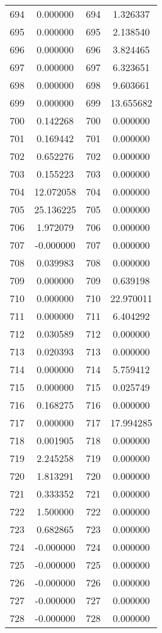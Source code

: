 \documentclass[12pt]{article}
\begin{document}
\begin{longtable}{@{}cccc@{}}
694 & 0.000000 & 694 & 1.326337 \\
695 & 0.000000 & 695 & 2.138540 \\
696 & 0.000000 & 696 & 3.824465 \\
697 & 0.000000 & 697 & 6.323651 \\
698 & 0.000000 & 698 & 9.603661 \\
699 & 0.000000 & 699 & 13.655682 \\
700 & 0.142268 & 700 & 0.000000 \\
701 & 0.169442 & 701 & 0.000000 \\
702 & 0.652276 & 702 & 0.000000 \\
703 & 0.155223 & 703 & 0.000000 \\
704 & 12.072058 & 704 & 0.000000 \\
705 & 25.136225 & 705 & 0.000000 \\
706 & 1.972079 & 706 & 0.000000 \\
707 & -0.000000 & 707 & 0.000000 \\
708 & 0.039983 & 708 & 0.000000 \\
709 & 0.000000 & 709 & 0.639198 \\
710 & 0.000000 & 710 & 22.970011 \\
711 & 0.000000 & 711 & 6.404292 \\
712 & 0.030589 & 712 & 0.000000 \\
713 & 0.020393 & 713 & 0.000000 \\
714 & 0.000000 & 714 & 5.759412 \\
715 & 0.000000 & 715 & 0.025749 \\
716 & 0.168275 & 716 & 0.000000 \\
717 & 0.000000 & 717 & 17.994285 \\
718 & 0.001905 & 718 & 0.000000 \\
719 & 2.245258 & 719 & 0.000000 \\
720 & 1.813291 & 720 & 0.000000 \\
721 & 0.333352 & 721 & 0.000000 \\
722 & 1.500000 & 722 & 0.000000 \\
723 & 0.682865 & 723 & 0.000000 \\
724 & -0.000000 & 724 & 0.000000 \\
725 & -0.000000 & 725 & 0.000000 \\
726 & -0.000000 & 726 & 0.000000 \\
727 & -0.000000 & 727 & 0.000000 \\
728 & -0.000000 & 728 & 0.000000 \\

\end{longtable}
\end{document}
